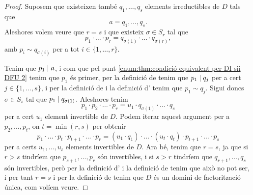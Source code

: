 \documentclass[../Apunts.tex]{subfiles}
\begin{document}
\begin{theorem}
\begin{proof}
			Suposem que existeixen també \(q_{1},\dots,q_{s}\) elements irreductibles de \(D\) tals que
			\[a=q_{1},\dots,q_{s}.\]
			Aleshores volem veure que \(r=s\) i que existeix \(\sigma\in S_{r}\) tal que
			\[p_{1}\cdot\ldots\cdot p_{r}=q_{\sigma(1)}\cdot\ldots\cdot q_{\sigma(r)},\]
			amb \(p_{i}\sim q_{\sigma(i)}\) per a tot \(i\in\{1,\dots,r\}\).
			
			Tenim que \(p_{1}\mathrel{|} a\), i com que pel punt \eqref{enum:thm:condició equivalent per DI sii DFU 2} tenim que \(p_{1}\) és primer, per la definició de  tenim que \(p_{1}\mathrel{|} q_{j}\) per a cert \(j\in\{1,\dots,s\}\), i per la definició de  i la definició d' tenim que \(p_{1}\sim q_{j}\). Sigui doncs \(\sigma\in S_{s}\) tal que \(p_{1}\mathrel{|} q_{\sigma(1)}\). Aleshores tenim
			\[p_{1}\cdot p_{2}\cdot\ldots\cdot p_{r}=u_{1}\cdot q_{\sigma(1)}\cdot\ldots\cdot q_{s}\]
			per a cert \(u_{1}\) element invertible de \(D\). Podem iterar aquest argument per a \(p_{2},\dots,p_{t}\), on \(t=\min(r,s)\) per obtenir
			\[p_{1}\cdot\ldots\cdot p_{t}\cdot p_{t+1}\cdot\ldots\cdot p_{r}=(u_{1}\cdot q_{1})\cdot\ldots\cdot(u_{t}\cdot q_{t})\cdot p_{t+1}\cdot\ldots \cdot p_{s}\]
			per a certs \(u_{1},\dots, u_{t}\) elements invertibles de \(D\). Ara bé, tenim que \(r=s\), ja que si \(r>s\) tindríem que \(p_{s+1},\dots,p_{r}\) són invertibles, i si \(s>r\) tindríem que \(q_{r+1},\dots,q_{s}\) són invertibles, però per la definició d' i la definició de  tenim que això no pot ser, i per tant \(r=s\) i per la definició de  tenim que \(D\) és un domini de factorització única, com volíem veure.
		\end{proof}
	\end{theorem}
\end{document}
